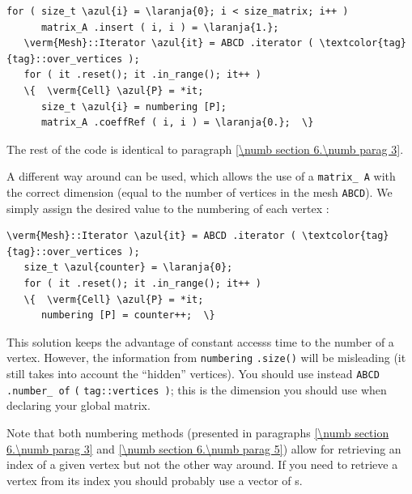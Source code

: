 \begin{Verbatim}[commandchars=\\\{\},formatcom=\small\tt,frame=single,
   label=parag-\ref{\numb section 6.\numb parag 5}.cpp,rulecolor=\color{moldura},
   baselinestretch=0.94,framesep=2mm                                            ]
   for ( size_t \azul{i} = \laranja{0}; i < size_matrix; i++ )
      matrix_A .insert ( i, i ) = \laranja{1.};
   \verm{Mesh}::Iterator \azul{it} = ABCD .iterator ( \textcolor{tag}{tag}::over_vertices );
   for ( it .reset(); it .in_range(); it++ )
   \{  \verm{Cell} \azul{P} = *it;
      size_t \azul{i} = numbering [P];
      matrix_A .coeffRef ( i, i ) = \laranja{0.};  \}
\end{Verbatim}

The rest of the code is identical to paragraph \ref{\numb section 6.\numb parag 3}.

A different way around can be used, which allows the use of a {\small\tt matrix\_\,A}
with the correct dimension (equal to the number of vertices in the mesh {\small\tt ABCD}).
We simply assign the desired value to the numbering of each vertex :

\begin{Verbatim}[commandchars=\\\{\},formatcom=\small\tt,frame=single,
   rulecolor=\color{moldura},baselinestretch=0.94,framesep=2mm          ]
   \verm{Mesh}::Iterator \azul{it} = ABCD .iterator ( \textcolor{tag}{tag}::over_vertices );
   size_t \azul{counter} = \laranja{0};
   for ( it .reset(); it .in_range(); it++ )
   \{  \verm{Cell} \azul{P} = *it;
      numbering [P] = counter++;  \}
\end{Verbatim}

This solution keeps the advantage of constant accesss time to the number of a vertex.
However, the information from {\small\tt numbering} {\small\tt .size()} will be misleading
(it still takes into account the ``hidden'' vertices).
You should use instead {\small\tt ABCD} {\small\tt .number\_\,of} {\small\tt (}
{\small\tt\textcolor{tag}{tag}::vertices )}; this is the dimension you should use
when declaring your global matrix.

Note that both numbering methods (presented in paragraphs \ref{\numb section 6.\numb parag 3}
and \ref{\numb section 6.\numb parag 5}) allow for retrieving
an index of a given vertex but not the other way around.
If you need to retrieve a vertex from its index you should probably use 
a vector of {\small\tt{}}s.


